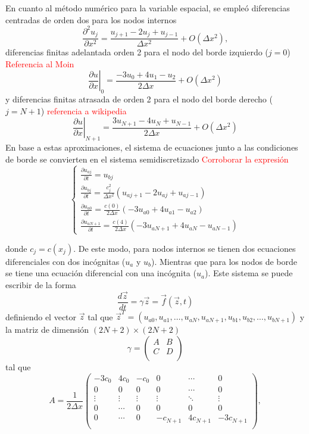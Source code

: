 \documentclass[aps,prb,twocolumn,superscriptaddress,floatfix,longbibliography,10pt]{revtex4-2}
\newcounter{para}
\begin{document}
En cuanto al método numérico para la variable espacial, se empleó diferencias centradas de orden dos para los nodos internos
\[\frac{\partial^2 u_j}{\partial x^2} = \frac{u_{j+1} - 2 u_j + u_{j-1}}{\Delta x^2} + O(\Delta x^2),  \]
diferencias finitas adelantada orden 2 para el nodo del borde izquierdo ($j = 0$) \textcolor{red}{Referencia al Moin}
\[\left . \frac{\partial u}{\partial x} \right |_0 = \frac{-3 u_0 + 4 u_{1} - u_{2}}{2 \Delta x} + O(\Delta x^2) \]
y diferencias finitas atrasada de orden 2 para el nodo del borde derecho ($j = N + 1$) \textcolor{red}{referencia a wikipedia}
\[\left . \frac{\partial u}{\partial x} \right |_{N+1} = \frac{3 u_{N+1} - 4 u_N + u_{N-1}}{2 \Delta x} + O(\Delta x^2) \]
En base a estas aproximaciones, el sistema de ecuaciones junto a las condiciones de borde se convierten en el sistema semidiscretizado \textcolor{red}{Corroborar la expresión}
\begin{equation}
  \left \{ \begin{matrix}
   \frac{\partial u_{a j}}{\partial t} = u_{b j} \\
   \frac{\partial u_{b j}}{\partial t} = \frac{c_j^2}{\Delta x^2} (u_{a j+1} - 2 u_{a j} + u_{a j-1}) \\
   \frac{\partial u_{a 0}}{\partial t} = \frac{c(0)}{2 \Delta x} (-3 u_{a 0} + 4 u_{a 1} - u_{a 2}) \\
   \frac{\partial u_{a N+1}}{\partial t} = \frac{c(4)}{2 \Delta x} (-3u_{a N+1} + 4 u_{a N} - u_{a N-1}) 
  \end{matrix} \right .
  \label{eq:sistema_semi_discretizado}
\end{equation}


donde $c_j = c(x_j)$. De este modo, para nodos internos se tienen dos ecuaciones diferenciales con dos incógnitas ($u_a$ y $u_b$). Mientras que para los nodos de borde se tiene una ecuación diferencial con una incógnita ($u_a$). Este sistema se puede escribir de la forma
\[\frac{d \vec{z}}{dt} = \gamma \vec{z} = \vec{f}(\vec{z},t)\]
definiendo el vector $\vec{z}$ tal que $\vec{z}^T = (u_{a 0}, u_{a 1}, \dots, u_{a N}, u_{a N+1}, u_{b 1}, u_{b 2}, \dots, u_{b N+1})$ y la matriz de dimensión $(2N+2) \times (2N+2)$
\[\gamma = \begin{pmatrix}
  A & B \\
  C & D \\
  \end{pmatrix}\]
tal que
\[A = \frac{1}{2 \Delta x} \begin{pmatrix}
  -3c_0 & 4c_0 & -c_0 & 0 & \cdots & 0 \\
  0 & 0 & 0 & 0 & \cdots & 0 \\
  \vdots & \vdots & \vdots & \vdots & \ddots & \vdots \\
  0 & \cdots & 0 & 0 & 0 & 0 \\
  0 & \cdots & 0 & -c_{N+1} & 4c_{N+1} & -3c_{N+1} \\
  \end{pmatrix}, \]
\end{document}
